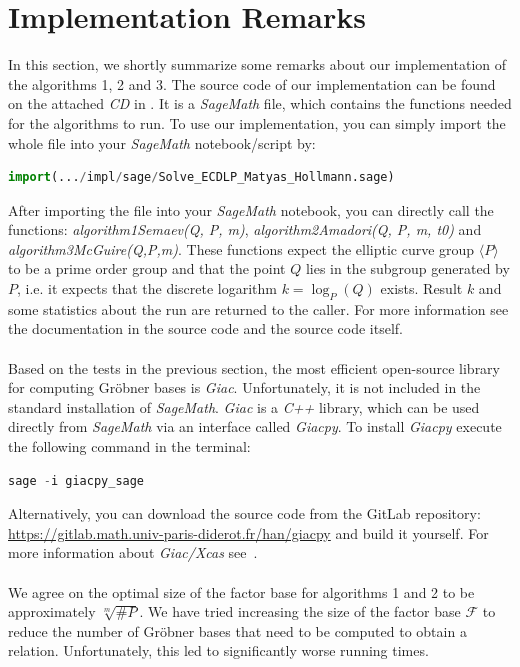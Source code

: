 \documentclass[thesis=M,english]{FITthesis}[2012/10/20]
\theoremstyle{remark}
\theoremstyle{definition}
\begin{document}
\section{Implementation Remarks}
In this section, we shortly summarize some remarks about our implementation of the algorithms 1, 2 and 3. The source code of our implementation can be found on the attached \textit{CD} in . It is a \textit{SageMath} file, which contains the functions needed for the algorithms to run. To use our implementation, you can simply import the whole file into your \textit{SageMath} notebook/script by:
\begin{lstlisting}[language=Python]
import(.../impl/sage/Solve_ECDLP_Matyas_Hollmann.sage)
\end{lstlisting}
After importing the file into your \textit{SageMath} notebook, you can directly call the functions: \textit{algorithm1Semaev(Q, P, m)}, \textit{algorithm2Amadori(Q, P, m, t0)} and \textit{algorithm3McGuire(Q,P,m)}.
These functions expect the elliptic curve group $\langle P \rangle$ to be a prime order group and that the point $Q$ lies in the subgroup generated by $P$, i.e. it expects that the discrete logarithm $k = \log_P(Q)$ exists. Result $k$ and some statistics about the run are returned to the caller. For more information see the documentation in the source code and the source code itself.
\\ \\
Based on the tests in the previous section, the most efficient open-source library for computing Gröbner bases is \textit{Giac}. Unfortunately, it is not included in the standard installation of \textit{SageMath}. \textit{Giac} is a \textit{C++} library, which can be used directly from \textit{SageMath} via an interface called \textit{Giacpy}. To install \textit{Giacpy} execute the following command in the terminal:
\begin{lstlisting}[language=Python]
sage -i giacpy_sage
\end{lstlisting}
Alternatively, you can download the source code from the GitLab repository: \url{https://gitlab.math.univ-paris-diderot.fr/han/giacpy} and build it yourself. For more information about \textit{Giac/Xcas} see~\cite{giac}.
\\ \\
\noindent We agree on the optimal size of the factor base for algorithms 1 and 2 to be approximately $\sqrt[m]{\#P}$. We have tried increasing the size of the factor base $\mathcal{F}$ to reduce the number of Gröbner bases that need to be computed to obtain a relation. Unfortunately, this led to significantly worse running times. \\ \\
\end{document}
